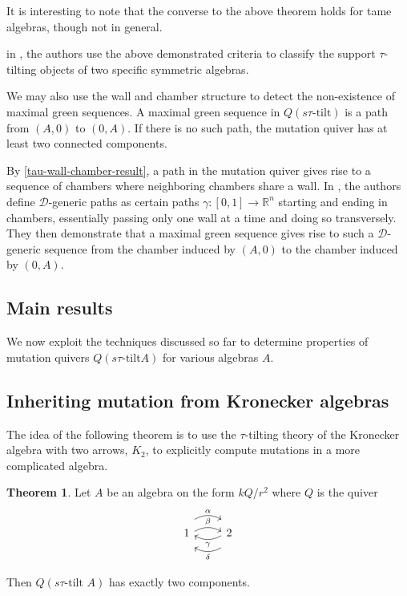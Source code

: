\documentclass[]{article}
\theoremstyle{definition}
\newtheorem{theorem}{Theorem}[section]
\newcommand{\tu}{\ensuremath{\tau}}
\begin{document}
It is interesting to note that the converse to the above theorem holds for tame algebras, though not in general\cite{keller2020tame}.

in \cite{dij17}, the authors use the above demonstrated criteria to classify the support \tu-tilting objects of two specific symmetric algebras. 

We may also use the wall and chamber structure to detect the non-existence of maximal green sequences. A maximal green sequence in $Q(s\tu\text{-tilt})$ is a path from $(A,0)$ to $(0,A)$. If there is no such path, the mutation quiver has at least two connected components.

By \cref{tau-wall-chamber-result}, a path in the mutation quiver gives rise to a sequence of chambers where neighboring chambers share a wall. In \cite{Br_stle_2019}, the authors define $\mathcal{D}$-generic paths as certain paths $\gamma:[0,1] \to \mathbb{R}^n$ starting and ending in chambers, essentially passing only one wall at a time and doing so transversely. They then demonstrate that a maximal green sequence gives rise to such a $\mathcal{D}$-generic sequence from the chamber induced by $(A,0)$ to the chamber induced by $(0,A)$.


\subsection{Main results}
We now exploit the techniques discussed so far to determine properties of mutation quivers $Q(s\tau\text{-tilt} A)$ for various algebras $A$.


\subsection{Inheriting mutation from Kronecker algebras}
The idea of the following theorem is to use the \tu-tilting theory of the Kronecker algebra with two arrows, $K_2$, to explicitly compute mutations in a more complicated algebra.

\begin{theorem}\label{k2-reduction}
	Let $A$ be an algebra on the form $kQ/r^2$ where $Q$ is the quiver	
	\[\begin{tikzcd}
	1 
	\arrow[r,bend left,shift right = 0.5ex, "\beta"]
	\arrow[r,bend left, shift left = 2ex, "\alpha"]
	& 2 \arrow[l,bend left,shift right = 0.5ex,"\gamma"]
	\arrow[l,bend left,shift left = 2ex, "\delta"]  \\
		\end{tikzcd}
	\]
	
	Then $Q(s\tau\text{-tilt } A)$ has exactly two components.
		
\end{theorem}
\end{document}
